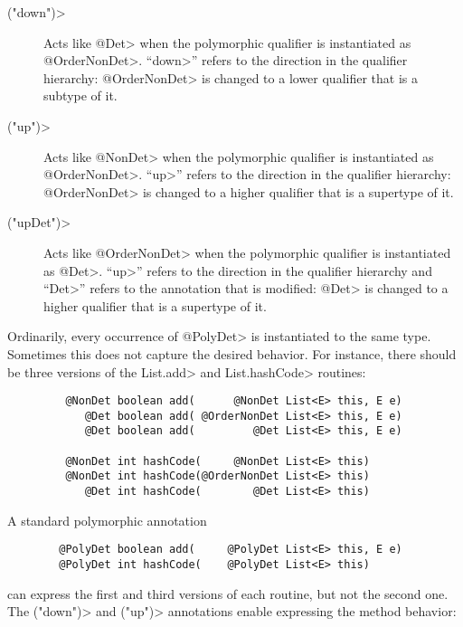 \begin{description}
\item[\<("down")>]
  Acts like \<@Det> when the polymorphic qualifier is instantiated as
  \<@OrderNonDet>.
  ``\<down>'' refers to the direction in the qualifier hierarchy:
  \<@OrderNonDet> is changed to a lower qualifier that is a subtype of it.
\item[\<("up")>]
  Acts like \<@NonDet> when the polymorphic qualifier is instantiated as
  \<@OrderNonDet>.
  ``\<up>'' refers to the direction in the qualifier hierarchy:
  \<@OrderNonDet> is changed to a higher qualifier that is a supertype of it.
\item[\<("upDet")>]
  Acts like \<@OrderNonDet> when the polymorphic qualifier is instantiated as
  \<@Det>.
  ``\<up>'' refers to the direction in the qualifier hierarchy and ``\<Det>''
  refers to the annotation that is modified:
  \<@Det> is changed to a higher qualifier that is a supertype of it.
\end{description}

Ordinarily, every occurrence of \<@PolyDet> is instantiated to the same
type.  Sometimes this does not capture the desired behavior.  For instance,
there should be three versions of the \<List.add> and \<List.hashCode> routines:

\begin{Verbatim}
         @NonDet boolean add(      @NonDet List<E> this, E e)
            @Det boolean add( @OrderNonDet List<E> this, E e)
            @Det boolean add(         @Det List<E> this, E e)

         @NonDet int hashCode(     @NonDet List<E> this)
         @NonDet int hashCode(@OrderNonDet List<E> this)
            @Det int hashCode(        @Det List<E> this)
\end{Verbatim}

A standard polymorphic annotation

\begin{Verbatim}
        @PolyDet boolean add(     @PolyDet List<E> this, E e)
        @PolyDet int hashCode(    @PolyDet List<E> this)
\end{Verbatim}

\noindent
can express the first and third versions of each routine, but not the
second one.  The \<("down")> and
\<("up")> annotations enable
expressing the method behavior:

